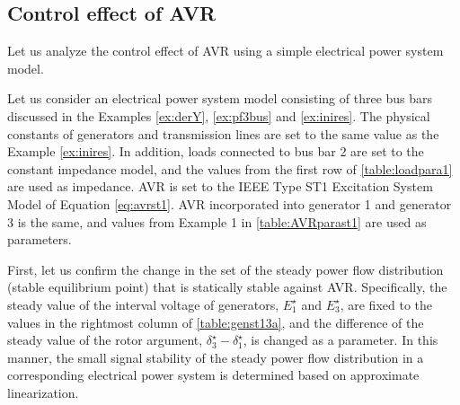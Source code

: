 \documentclass[graybox, envcountchap]{svmult}
\begin{document}
\subsection{Control effect of AVR}

Let us analyze the control effect of AVR using a simple electrical power system model.

\begin{例}[自動電圧調整器による定態安定性と過渡安定度の変化]\label{ex:avreffect}
Let us consider an electrical power system model consisting of three bus bars discussed in the Examples \ref{ex:derY}, \ref{ex:pf3bus} and \ref{ex:inires}.
The physical constants of generators and transmission lines are set to the same value as the Example \ref{ex:inires}.
In addition, loads connected to bus bar 2 are set to the constant impedance model, and the values from the first row of \ref{table:loadpara1} are used as impedance.
AVR is set to the IEEE Type ST1 Excitation System Model of Equation \ref{eq:avrst1}. AVR incorporated into generator 1 and generator 3 is the same, and values from Example 1 in \ref{table:AVRparast1} are used as parameters.

First, let us confirm the change in the set of the steady power flow distribution (stable equilibrium point) that is statically stable against AVR.
Specifically, the steady value of the interval voltage of generators, $E_1^{\star}$ and $E_3^{\star}$, are fixed to the values in the rightmost column of \ref{table:genst13a}, and the difference of the steady value of the rotor argument, $\delta_3^{\star}-\delta_1^{\star}$, is changed as a parameter.
In this manner, the small signal stability of the steady power flow distribution in a corresponding electrical power system is determined based on approximate linearization.


\end{例}
\end{document}
